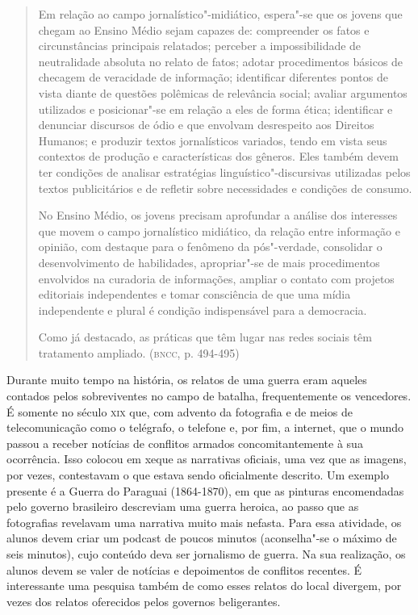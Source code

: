 \documentclass[12pt]{extarticle}
\begin{document}
\begin{quote}
Em relação ao campo jornalístico"-midiático, espera"-se que os jovens
que chegam ao Ensino Médio sejam capazes de: compreender os fatos e
circunstâncias principais relatados; perceber a impossibilidade de
neutralidade absoluta no relato de fatos; adotar procedimentos básicos
de checagem de veracidade de informação; identificar diferentes pontos
de vista diante de questões polêmicas de relevância social; avaliar
argumentos utilizados e posicionar"-se em relação a eles de forma ética;
identificar e denunciar discursos de ódio e que envolvam desrespeito aos
Direitos Humanos; e produzir textos jornalísticos variados, tendo em
vista seus contextos de produção e características dos gêneros. Eles
também devem ter condições de analisar estratégias
linguístico"-discursivas utilizadas pelos textos publicitários e de
refletir sobre necessidades e condições de consumo.

No Ensino Médio, os jovens precisam aprofundar a análise dos interesses
que movem o campo jornalístico midiático, da relação entre informação e
opinião, com destaque para o fenômeno da pós"-verdade, consolidar o
desenvolvimento de habilidades, apropriar"-se de mais procedimentos
envolvidos na curadoria de informações, ampliar o contato com projetos
editoriais independentes e tomar consciência de que uma mídia
independente e plural é condição indispensável para a democracia.

Como já destacado, as práticas que têm lugar nas redes sociais têm
tratamento ampliado. (\textsc{bncc}, p. 494-495)
\end{quote}

Durante muito tempo na história, os relatos de uma guerra eram aqueles
contados pelos sobreviventes no campo de batalha, frequentemente os
vencedores. É somente no século \textsc{xix} que, com advento da fotografia e
de meios de telecomunicação como o telégrafo, o telefone e, por fim, a
internet, que o mundo passou a receber notícias de conflitos armados
concomitantemente à sua ocorrência. Isso colocou em xeque as
narrativas oficiais, uma vez que as imagens, por vezes, contestavam o
que estava sendo oficialmente descrito. Um exemplo presente é a Guerra
do Paraguai (1864-1870), em que as pinturas encomendadas pelo governo
brasileiro descreviam uma guerra heroica, ao passo que as fotografias
revelavam uma narrativa muito mais nefasta. Para essa atividade, os
alunos devem criar um podcast de poucos minutos (aconselha"-se o máximo
de seis minutos), cujo conteúdo deva ser jornalismo de guerra. Na sua
realização, os alunos devem se valer de notícias e depoimentos de
conflitos recentes. É interessante uma pesquisa também de como esses
relatos do local divergem, por vezes dos relatos oferecidos pelos
governos beligerantes.
\end{document}
